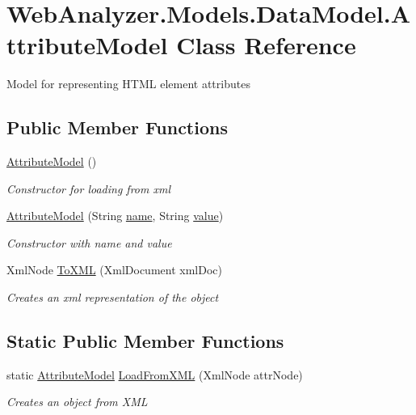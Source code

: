 \hypertarget{class_web_analyzer_1_1_models_1_1_data_model_1_1_attribute_model}{}\section{Web\+Analyzer.\+Models.\+Data\+Model.\+Attribute\+Model Class Reference}
\label{class_web_analyzer_1_1_models_1_1_data_model_1_1_attribute_model}


Model for representing H\+T\+M\+L element attributes  


\subsection*{Public Member Functions}
\begin{DoxyCompactItemize}
\item 
\hyperlink{class_web_analyzer_1_1_models_1_1_data_model_1_1_attribute_model_a7b736b820a7e06de49cf2d937a898579}{Attribute\+Model} ()
\begin{DoxyCompactList}\small\item\em Constructor for loading from xml \end{DoxyCompactList}\item 
\hyperlink{class_web_analyzer_1_1_models_1_1_data_model_1_1_attribute_model_a9521c8ec3b53c8e617249323ecd2f291}{Attribute\+Model} (String \hyperlink{_u_i_2_h_t_m_l_resources_2js_2src_2create__experiment_8js_adac2bcb4f01b574cbc63fe8ee2c56bf0}{name}, String \hyperlink{_u_i_2_h_t_m_l_resources_2js_2lib_2underscore_8min_8js_af7e1471ab89699458c4df8bb657298f6}{value})
\begin{DoxyCompactList}\small\item\em Constructor with name and value \end{DoxyCompactList}\item 
Xml\+Node \hyperlink{class_web_analyzer_1_1_models_1_1_data_model_1_1_attribute_model_af9a4c1d421bd73f4c25edd4f6df7ad42}{To\+X\+M\+L} (Xml\+Document xml\+Doc)
\begin{DoxyCompactList}\small\item\em Creates an xml representation of the object \end{DoxyCompactList}\end{DoxyCompactItemize}
\subsection*{Static Public Member Functions}
\begin{DoxyCompactItemize}
\item 
static \hyperlink{class_web_analyzer_1_1_models_1_1_data_model_1_1_attribute_model}{Attribute\+Model} \hyperlink{class_web_analyzer_1_1_models_1_1_data_model_1_1_attribute_model_a84e8555e8b89040f69ba84836aadeade}{Load\+From\+X\+M\+L} (Xml\+Node attr\+Node)
\begin{DoxyCompactList}\small\item\em Creates an object from X\+M\+L \end{DoxyCompactList}\end{DoxyCompactItemize}
